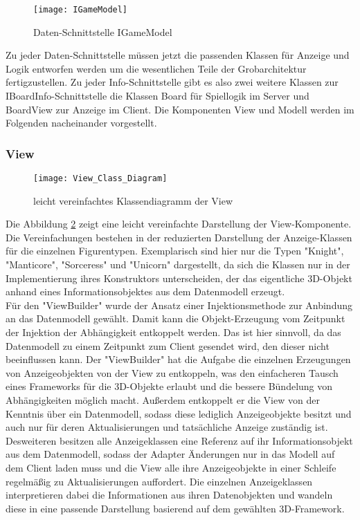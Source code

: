 \begin{figure}[htp]
	\centering
	\captionsetup{justification=centering}
	\texttt{[image: IGameModel]}
	\caption[IGameModel]{Daten-Schnittstelle IGameModel}
	\label{fig:IGameModel}
\end{figure}
\noindent Zu jeder Daten-Schnittstelle müssen jetzt die passenden Klassen für Anzeige und Logik entworfen werden um die wesentlichen Teile der Grobarchitektur fertigzustellen. Zu jeder Info-Schnittstelle gibt es also zwei weitere Klassen \zB zur IBoardInfo-Schnittstelle die Klassen Board für Spiellogik im Server und BoardView zur Anzeige im Client. Die Komponenten View und Modell werden im Folgenden nacheinander vorgestellt.
\clearpage
\subsubsection{View}
\begin{figure}[htp]
	\centering
	\captionsetup{justification=centering}
	\texttt{[image: View\_Class\_Diagram]}
	\caption[View]{leicht vereinfachtes Klassendiagramm der View}
	\label{fig:ClassesView}
\end{figure}

\noindent Die Abbildung \ref{fig:ClassesView} zeigt eine leicht vereinfachte Darstellung der View-Komponente. Die Vereinfachungen bestehen in der reduzierten Darstellung der Anzeige-Klassen für die einzelnen Figurentypen. Exemplarisch sind hier nur die Typen "Knight", "Manticore", "Sorceress" und "Unicorn" dargestellt, da sich die Klassen nur in der Implementierung ihres Konstruktors unterscheiden, der das eigentliche 3D-Objekt anhand eines Informationsobjektes aus dem Datenmodell erzeugt.\\
Für den "ViewBuilder" wurde der Ansatz einer Injektionsmethode zur Anbindung an das Datenmodell gewählt. Damit kann die Objekt-Erzeugung vom Zeitpunkt der Injektion der Abhängigkeit entkoppelt werden. Das ist hier sinnvoll, da das Datenmodell zu einem Zeitpunkt zum Client gesendet wird, den dieser nicht beeinflussen kann. Der "ViewBuilder" hat die Aufgabe die einzelnen Erzeugungen von Anzeigeobjekten von der View zu entkoppeln, was den einfacheren Tausch eines Frameworks für die 3D-Objekte erlaubt und die bessere Bündelung von Abhängigkeiten möglich macht. Außerdem entkoppelt er die View von der Kenntnis über ein Datenmodell, sodass diese lediglich Anzeigeobjekte besitzt und auch nur für deren Aktualisierungen und tatsächliche Anzeige zuständig ist.\\
Desweiteren besitzen alle Anzeigeklassen eine Referenz auf ihr Informationsobjekt aus dem Datenmodell, sodass der Adapter Änderungen nur in das Modell auf dem Client laden muss und die View alle ihre Anzeigeobjekte in einer Schleife regelmäßig zu Aktualisierungen auffordert. Die einzelnen Anzeigeklassen interpretieren dabei die Informationen aus ihren Datenobjekten und wandeln diese in eine passende Darstellung basierend auf dem gewählten 3D-Framework.\\

